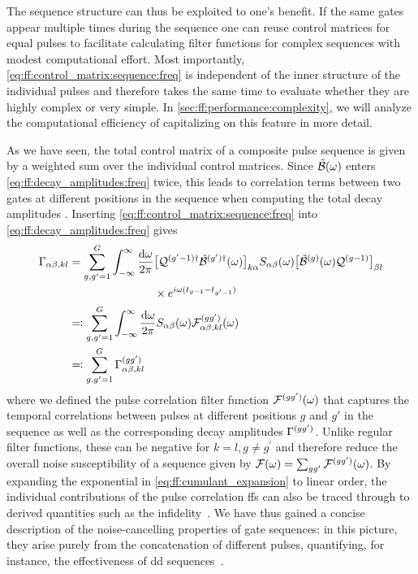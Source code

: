 The sequence structure can thus be exploited to one's benefit.
If the same gates appear multiple times during the sequence one can reuse control matrices for equal pulses to facilitate calculating filter functions for complex sequences with modest computational effort.
Most importantly, \cref{eq:ff:control_matrix:sequence:freq} is independent of the inner structure of the individual pulses and therefore takes the same time to evaluate whether they are highly complex or very simple.
In \cref{sec:ff:performance:complexity}, we will analyze the computational efficiency of capitalizing on this feature in more detail.

As we have seen, the total control matrix of a composite pulse sequence is given by a weighted sum over the individual control matrices.
Since $\tilde{\mathcal{B}}(\omega)$ enters \cref{eq:ff:decay_amplitudes:freq} twice, this leads to correlation terms between two gates at different positions in the sequence when computing the total decay amplitudes \decayamps.
Inserting \cref{eq:ff:control_matrix:sequence:freq} into \cref{eq:ff:decay_amplitudes:freq} gives
\begin{align}\label{eq:ff:decay_amplitudes:pulse_correlation}
    \Gamma_{\alpha\beta,kl} &= \begin{aligned}[t]
        \sum_{g,g^\prime=1}^{G}\int_{-\infty}^\infty\frac{\dd{\omega}}{2\pi} &
        \bigl[\mathcal{Q}^{(g^\prime-1)\dagger}\tilde{\mathcal{B}}^{(g^\prime)\dagger}(\omega)\bigr]_{k\alpha}
        S_{\alpha\beta}(\omega)
        \bigl[\tilde{\mathcal{B}}^{(g)}(\omega)\mathcal{Q}^{(g-1)}\bigr]_{\beta l} \\
        &\times e^{i\omega(t_{g-1} - t_{g^\prime-1})} \\
    \end{aligned} \notag\\
    &\eqqcolon\sum_{g,g^\prime=1}^{G}\int_{-\infty}^\infty\frac{\dd{\omega}}{2\pi} S_{\alpha\beta}(\omega) \mathcal{F}_{\alpha\beta,kl}^{(gg^\prime)}(\omega) \\
    &\eqqcolon\sum_{g,g^\prime=1}^{G}\Gamma_{\alpha\beta,kl}^{(gg^\prime)} \notag
\end{align}
where we defined the pulse correlation filter function $\mathcal{F}^{(gg^\prime)}(\omega)$ that captures the temporal correlations between pulses at different positions $g$ and $g'$ in the sequence as well as the corresponding decay amplitudes $\Gamma^{(gg^\prime)}$.
Unlike regular filter functions, these can be negative for $k=l, g\neq g^\prime$ and therefore reduce the overall noise susceptibility of a sequence given by $\mathcal{F}(\omega) = \sum_{gg^\prime}\mathcal{F}^{(gg^\prime)}(\omega)$.
By expanding the exponential in \cref{eq:ff:cumulant_expansion} to linear order, the individual contributions of the pulse correlation \glspl{ff} can also be traced through to derived quantities such as the infidelity~\cite[Equation 11]{Cerfontaine2021}.
We have thus gained a concise description of the noise-cancelling properties of gate sequences: in this picture, they arise purely from the concatenation of different pulses, quantifying, for instance, the effectiveness of \gls{dd} sequences~\cite{Cerfontaine2021}.

